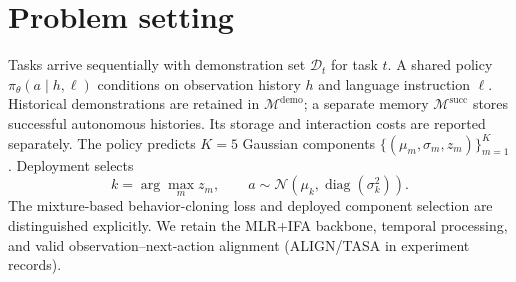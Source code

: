 \section{Problem setting}
Tasks arrive sequentially with demonstration set $\mathcal D_t$ for task
$t$. A shared policy $\pi_\theta(a\mid h,\ell)$ conditions on observation
history $h$ and language instruction $\ell$. Historical demonstrations
are retained in $\mathcal M^{\mathrm{demo}}$; a separate memory
$\mathcal M^{\mathrm{succ}}$ stores successful autonomous histories.
Its storage and interaction costs are reported separately.
The policy predicts $K=5$ Gaussian components
$\{(\mu_m,\sigma_m,z_m)\}_{m=1}^K$. Deployment selects
\begin{equation}
k=\arg\max_m z_m,\qquad
a\sim\mathcal N(\mu_k,\operatorname{diag}(\sigma_k^2)).
\end{equation}
The mixture-based behavior-cloning loss and deployed component selection
are distinguished explicitly.
We retain the MLR+IFA backbone, temporal processing, and valid
observation--next-action alignment (ALIGN/TASA in experiment records).
